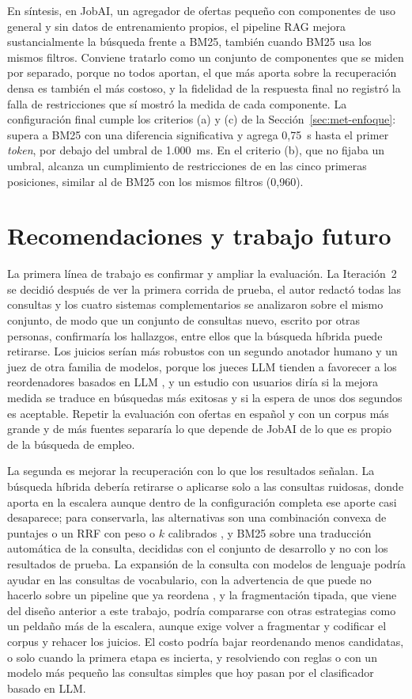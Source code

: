 En síntesis, en JobAI, un agregador de ofertas pequeño con componentes de uso general y sin datos de entrenamiento propios, el pipeline RAG mejora sustancialmente la búsqueda frente a BM25, también cuando BM25 usa los mismos filtros. Conviene tratarlo como un conjunto de componentes que se miden por separado, porque no todos aportan, el que más aporta sobre la recuperación densa es también el más costoso, y la fidelidad de la respuesta final no registró la falla de restricciones que sí mostró la medida de cada componente. La configuración final cumple los criterios (a) y (c) de la Sección~\ref{sec:met-enfoque}: supera a BM25 con una diferencia significativa y agrega 0,75~s hasta el primer \textit{token}, por debajo del umbral de 1.000~ms. En el criterio (b), que no fijaba un umbral, alcanza un cumplimiento de restricciones de \cCumplCompleta{} en las cinco primeras posiciones, similar al de BM25 con los mismos filtros (0,960).

\section{Recomendaciones y trabajo futuro}

La primera línea de trabajo es confirmar y ampliar la evaluación. La Iteración~2 se decidió después de ver la primera corrida de prueba, el autor redactó todas las consultas y los cuatro sistemas complementarios se analizaron sobre el mismo conjunto, de modo que un conjunto de consultas nuevo, escrito por otras personas, confirmaría los hallazgos, entre ellos que la búsqueda híbrida puede retirarse. Los juicios serían más robustos con un segundo anotador humano y un juez de otra familia de modelos, porque los jueces LLM tienden a favorecer a los reordenadores basados en LLM \citep{Frobe2025}, y un estudio con usuarios diría si la mejora medida se traduce en búsquedas más exitosas y si la espera de unos dos segundos es aceptable. Repetir la evaluación con ofertas en español y con un corpus más grande y de más fuentes separaría lo que depende de JobAI de lo que es propio de la búsqueda de empleo.

La segunda es mejorar la recuperación con lo que los resultados señalan. La búsqueda híbrida debería retirarse o aplicarse solo a las consultas ruidosas, donde aporta en la escalera aunque dentro de la configuración completa ese aporte casi desaparece; para conservarla, las alternativas son una combinación convexa de puntajes o un RRF con peso o $k$ calibrados \citep{Bruch2023}, y BM25 sobre una traducción automática de la consulta, decididas con el conjunto de desarrollo y no con los resultados de prueba. La expansión de la consulta con modelos de lenguaje \citep{Wang2023Query2doc} podría ayudar en las consultas de vocabulario, con la advertencia de que puede no hacerlo sobre un pipeline que ya reordena \citep{Weller2024}, y la fragmentación tipada, que viene del diseño anterior a este trabajo, podría compararse con otras estrategias como un peldaño más de la escalera, aunque exige volver a fragmentar y codificar el corpus y rehacer los juicios. El costo podría bajar reordenando menos candidatas, o solo cuando la primera etapa es incierta, y resolviendo con reglas o con un modelo más pequeño las consultas simples que hoy pasan por el clasificador basado en LLM.

